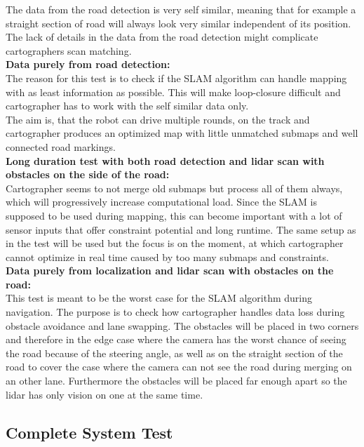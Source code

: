 The data from the road detection is very self similar, meaning that for example a straight section of road will always look very similar independent of its position. The lack of details in the data from the road detection might complicate cartographers scan matching.\\

\textbf{Data purely from road detection:}\\
The reason for this test is to check if the SLAM algorithm can handle mapping with as least information as possible. This will make loop-closure difficult and cartographer has to work with the self similar data only.\\
The aim is, that the robot can drive multiple rounds, on the track and cartographer produces an optimized map with little unmatched submaps and well connected road markings.\\

\textbf{Long duration test with both road detection and lidar scan with obstacles on the side of the road:}\\
Cartographer seems to not merge old submaps but process all of them always, which will progressively increase computational load. Since the SLAM is supposed to be used during mapping, this can become important with a lot of sensor inputs that offer constraint potential and long runtime.
The same setup as in the  test will be used but the focus is on the moment, at which cartographer cannot optimize in real time caused by too many submaps and constraints.\\


\textbf{Data purely from localization and lidar scan with obstacles on the road:}\\
This test is meant to be the worst case for the SLAM algorithm during navigation. The purpose is to check how cartographer handles data loss during obstacle avoidance and lane swapping.
The obstacles will be placed in two corners and therefore in the edge case where the camera has the worst chance of seeing the road because of the steering angle, as well as on the straight section of the road to cover the case where the camera can not see the road during merging on an other lane. Furthermore the obstacles will be placed far enough apart so the lidar has only vision on one at the same time.\\


\subsection{Complete System Test}

